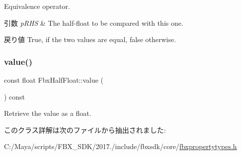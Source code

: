 Equivalence operator. 
\begin{DoxyParams}{引数}
{\em p\+R\+HS} & The half-\/float to be compared with this one. \\
\hline
\end{DoxyParams}
\begin{DoxyReturn}{戻り値}
{\ttfamily True}, if the two values are equal, {\ttfamily false} otherwise. 
\end{DoxyReturn}
\mbox{\label{class_fbx_half_float_a0ee86f74d6747ac89a1081695dd14b37}} 
\subsubsection{\texorpdfstring{value()}{value()}}
{\footnotesize\ttfamily const float Fbx\+Half\+Float\+::value (\begin{DoxyParamCaption}{ }\end{DoxyParamCaption}) const}

Retrieve the value as a float. 

このクラス詳解は次のファイルから抽出されました\+:\begin{DoxyCompactItemize}
\item 
C\+:/\+Maya/scripts/\+F\+B\+X\+\_\+\+S\+D\+K/2017./include/fbxsdk/core/\hyperlink{fbxpropertytypes_8h}{fbxpropertytypes.\+h}\end{DoxyCompactItemize}
